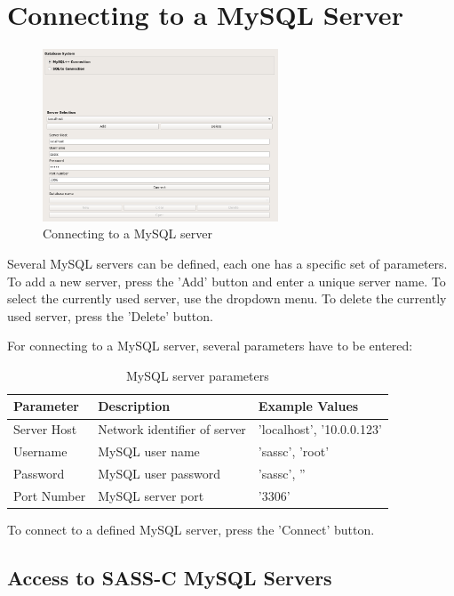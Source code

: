 \section{Connecting to a MySQL Server}
\label{sec:mysql_connect}

\begin{figure}[H]
  \center
    \includegraphics[width=7cm,frame]{../screenshots/mysql_server_selection.png}
  \caption{Connecting to a MySQL server}
  \label{fig:mysql_connect}
\end{figure}

Several MySQL servers can be defined, each one has a specific set of parameters. To add a new server, press the 'Add' button and enter a unique server name. To select the currently used server, use the dropdown menu. To delete the currently used server, press the 'Delete' button.

For connecting to a MySQL server, several parameters have to be entered:

\begin{table}[H]
  \center
  \begin{tabular}{ | l | l | l |}
    \hline
    \textbf{Parameter} & \textbf{Description} & \textbf{Example Values} \\ \hline
    Server Host & Network identifier of server & 'localhost', '10.0.0.123' \\ \hline
    Username & MySQL user name & 'sassc', 'root' \\ \hline
    Password & MySQL user password & 'sassc', '' \\ \hline
    Port Number & MySQL server port & '3306' \\
    \hline
  \end{tabular}
  \caption{MySQL server parameters}
\end{table}

To connect to a defined MySQL server, press the 'Connect' button.\\

\subsection{Access to SASS-C MySQL Servers}

